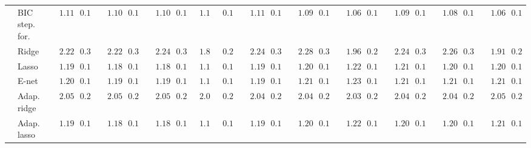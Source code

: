 \begin{tabular}{llllllllllllllllllllll}
	& BIC step. for.  & $\phantom{00}1.111$ & $\phantom{0}0.134$ & $\phantom{00}1.108$ & $\phantom{0}0.133$ & $\phantom{00}1.107$ & $\phantom{0}0.136$ & $\phantom{0}1.101$ & $\phantom{0}0.122$ & $\phantom{00}1.112$ & $\phantom{0}0.131$ & $\phantom{00}1.093$ & $\phantom{0}0.110$ & $\phantom{00}1.069$ & $\phantom{0}0.122$ & $\phantom{00}1.096$ & $\phantom{0}0.131$ & $\phantom{00}1.087$ & $\phantom{0}0.141$ & $\phantom{00}1.069$ & $\phantom{0}0.120$ \\
	& Ridge  & $\phantom{00}2.222$ & $\phantom{0}0.337$ & $\phantom{00}2.225$ & $\phantom{0}0.345$ & $\phantom{00}2.243$ & $\phantom{0}0.345$ & $\phantom{0}1.856$ & $\phantom{0}0.226$ & $\phantom{00}2.243$ & $\phantom{0}0.345$ & $\phantom{00}2.288$ & $\phantom{0}0.333$ & $\phantom{00}1.962$ & $\phantom{0}0.241$ & $\phantom{00}2.244$ & $\phantom{0}0.334$ & $\phantom{00}2.261$ & $\phantom{0}0.318$ & $\phantom{00}1.919$ & $\phantom{0}0.224$ \\
	& Lasso  & $\phantom{00}1.191$ & $\phantom{0}0.157$ & $\phantom{00}1.184$ & $\phantom{0}0.142$ & $\phantom{00}1.187$ & $\phantom{0}0.143$ & $\phantom{0}1.185$ & $\phantom{0}0.144$ & $\phantom{00}1.192$ & $\phantom{0}0.159$ & $\phantom{00}1.209$ & $\phantom{0}0.145$ & $\phantom{00}1.226$ & $\phantom{0}0.147$ & $\phantom{00}1.212$ & $\phantom{0}0.137$ & $\phantom{00}1.200$ & $\phantom{0}0.150$ & $\phantom{00}1.206$ & $\phantom{0}0.141$ \\
	& E-net  & $\phantom{00}1.201$ & $\phantom{0}0.157$ & $\phantom{00}1.193$ & $\phantom{0}0.141$ & $\phantom{00}1.196$ & $\phantom{0}0.138$ & $\phantom{0}1.189$ & $\phantom{0}0.143$ & $\phantom{00}1.198$ & $\phantom{0}0.157$ & $\phantom{00}1.214$ & $\phantom{0}0.140$ & $\phantom{00}1.234$ & $\phantom{0}0.147$ & $\phantom{00}1.215$ & $\phantom{0}0.142$ & $\phantom{00}1.211$ & $\phantom{0}0.154$ & $\phantom{00}1.214$ & $\phantom{0}0.141$ \\
	& Adap. ridge  & $\phantom{00}2.050$ & $\phantom{0}0.283$ & $\phantom{00}2.050$ & $\phantom{0}0.283$ & $\phantom{00}2.053$ & $\phantom{0}0.283$ & $\phantom{0}2.052$ & $\phantom{0}0.282$ & $\phantom{00}2.049$ & $\phantom{0}0.283$ & $\phantom{00}2.049$ & $\phantom{0}0.282$ & $\phantom{00}2.039$ & $\phantom{0}0.281$ & $\phantom{00}2.049$ & $\phantom{0}0.283$ & $\phantom{00}2.049$ & $\phantom{0}0.283$ & $\phantom{00}2.050$ & $\phantom{0}0.283$ \\
	& Adap. lasso  & $\phantom{00}1.190$ & $\phantom{0}0.157$ & $\phantom{00}1.185$ & $\phantom{0}0.144$ & $\phantom{00}1.186$ & $\phantom{0}0.139$ & $\phantom{0}1.190$ & $\phantom{0}0.147$ & $\phantom{00}1.190$ & $\phantom{0}0.156$ & $\phantom{00}1.209$ & $\phantom{0}0.145$ & $\phantom{00}1.228$ & $\phantom{0}0.148$ & $\phantom{00}1.209$ & $\phantom{0}0.136$ & $\phantom{00}1.203$ & $\phantom{0}0.152$ & $\phantom{00}1.210$ & $\phantom{0}0.148$ \\

\end{tabular}

